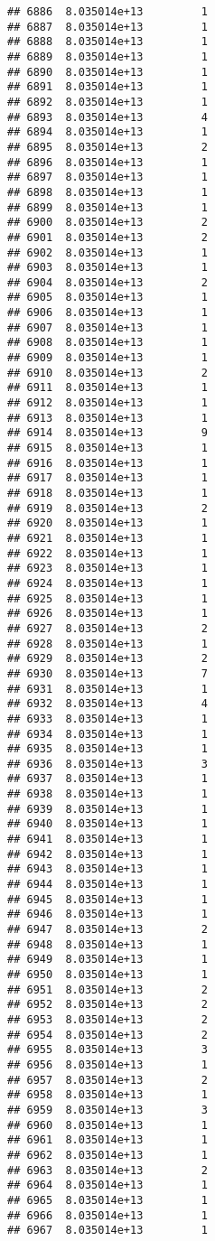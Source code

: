 \documentclass[
]{article}
\begin{document}
\begin{verbatim}
## 6886  8.035014e+13         1
## 6887  8.035014e+13         1
## 6888  8.035014e+13         1
## 6889  8.035014e+13         1
## 6890  8.035014e+13         1
## 6891  8.035014e+13         1
## 6892  8.035014e+13         1
## 6893  8.035014e+13         4
## 6894  8.035014e+13         1
## 6895  8.035014e+13         2
## 6896  8.035014e+13         1
## 6897  8.035014e+13         1
## 6898  8.035014e+13         1
## 6899  8.035014e+13         1
## 6900  8.035014e+13         2
## 6901  8.035014e+13         2
## 6902  8.035014e+13         1
## 6903  8.035014e+13         1
## 6904  8.035014e+13         2
## 6905  8.035014e+13         1
## 6906  8.035014e+13         1
## 6907  8.035014e+13         1
## 6908  8.035014e+13         1
## 6909  8.035014e+13         1
## 6910  8.035014e+13         2
## 6911  8.035014e+13         1
## 6912  8.035014e+13         1
## 6913  8.035014e+13         1
## 6914  8.035014e+13         9
## 6915  8.035014e+13         1
## 6916  8.035014e+13         1
## 6917  8.035014e+13         1
## 6918  8.035014e+13         1
## 6919  8.035014e+13         2
## 6920  8.035014e+13         1
## 6921  8.035014e+13         1
## 6922  8.035014e+13         1
## 6923  8.035014e+13         1
## 6924  8.035014e+13         1
## 6925  8.035014e+13         1
## 6926  8.035014e+13         1
## 6927  8.035014e+13         2
## 6928  8.035014e+13         1
## 6929  8.035014e+13         2
## 6930  8.035014e+13         7
## 6931  8.035014e+13         1
## 6932  8.035014e+13         4
## 6933  8.035014e+13         1
## 6934  8.035014e+13         1
## 6935  8.035014e+13         1
## 6936  8.035014e+13         3
## 6937  8.035014e+13         1
## 6938  8.035014e+13         1
## 6939  8.035014e+13         1
## 6940  8.035014e+13         1
## 6941  8.035014e+13         1
## 6942  8.035014e+13         1
## 6943  8.035014e+13         1
## 6944  8.035014e+13         1
## 6945  8.035014e+13         1
## 6946  8.035014e+13         1
## 6947  8.035014e+13         2
## 6948  8.035014e+13         1
## 6949  8.035014e+13         1
## 6950  8.035014e+13         1
## 6951  8.035014e+13         2
## 6952  8.035014e+13         2
## 6953  8.035014e+13         2
## 6954  8.035014e+13         2
## 6955  8.035014e+13         3
## 6956  8.035014e+13         1
## 6957  8.035014e+13         2
## 6958  8.035014e+13         1
## 6959  8.035014e+13         3
## 6960  8.035014e+13         1
## 6961  8.035014e+13         1
## 6962  8.035014e+13         1
## 6963  8.035014e+13         2
## 6964  8.035014e+13         1
## 6965  8.035014e+13         1
## 6966  8.035014e+13         1
## 6967  8.035014e+13         1

\end{verbatim}
\end{document}
